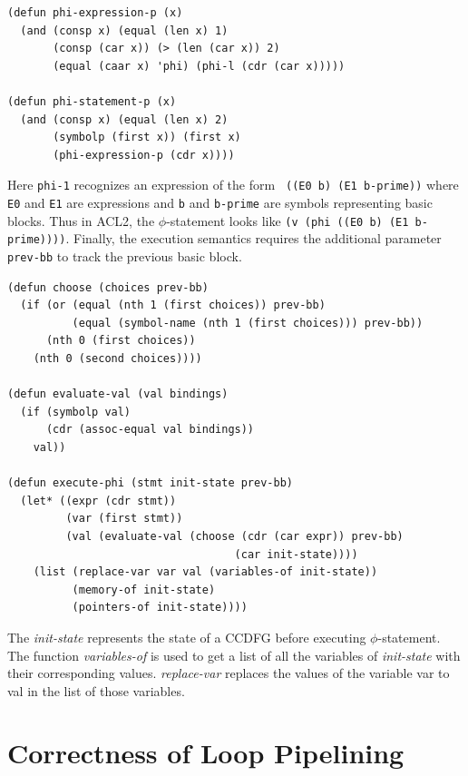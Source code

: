 \small
\begin{verbatim}
(defun phi-expression-p (x)
  (and (consp x) (equal (len x) 1)
       (consp (car x)) (> (len (car x)) 2)
       (equal (caar x) 'phi) (phi-l (cdr (car x)))))

(defun phi-statement-p (x)
  (and (consp x) (equal (len x) 2)
       (symbolp (first x)) (first x)
       (phi-expression-p (cdr x))))
\end{verbatim}
\normalsize

Here {\tt phi-1} recognizes an expression of the form {\tt
  ((E0 b) (E1 b-prime))} where {\tt E0} and {\tt E1} are
expressions and {\tt b} and {\tt b-prime} are symbols
representing basic blocks.  Thus in ACL2, the
$\phi$-statement looks like {\tt (v (phi ((E0 b) (E1
  b-prime))))}.  Finally, the execution semantics requires
the additional parameter {\tt prev-bb} to track the previous
basic block.


\small
\begin{verbatim}
(defun choose (choices prev-bb)
  (if (or (equal (nth 1 (first choices)) prev-bb)
          (equal (symbol-name (nth 1 (first choices))) prev-bb))
      (nth 0 (first choices))
    (nth 0 (second choices))))
    
(defun evaluate-val (val bindings)
  (if (symbolp val) 
      (cdr (assoc-equal val bindings)) 
    val))

(defun execute-phi (stmt init-state prev-bb)
  (let* ((expr (cdr stmt))
         (var (first stmt))
         (val (evaluate-val (choose (cdr (car expr)) prev-bb) 
                                   (car init-state))))
    (list (replace-var var val (variables-of init-state)) 
          (memory-of init-state) 
          (pointers-of init-state))))         
\end{verbatim}
\normalsize

The {\em init-state} represents the state of a CCDFG before executing $\phi$-statement. The function 
{\em variables-of} is used to get a list of all the variables of {\em init-state} with their corresponding values. 
{\em replace-var} replaces the values of the variable {var} to {val} in the list of those variables.


\section{Correctness of Loop Pipelining}

